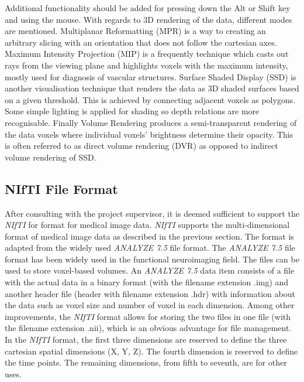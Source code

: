 \documentclass[a4paper,11pt,twoside]{article}
\begin{document}
Additional functionality should be added for pressing down the Alt or Shift key and using the mouse.
With regards to 3D rendering of the data, different modes are mentioned. Multiplanar Reformatting (MPR) is a way to creating an arbitrary slicing with an orientation that does not follow the cartesian axes. Maximum Intensity Projection (MIP) is a frequently technique which casts out rays from the viewing plane and highlights voxels with the maximum intensity, mostly used for diagnosis of vascular structures. Surface Shaded Display (SSD) is another visualisation technique that renders the data as 3D shaded surfaces based on a  given threshold. This is achieved by connecting adjacent voxels as polygons. Some simple lighting is applied for shading so depth relations are more recognisable. Finally Volume Rendering produces a semi-transparent rendering of the data voxels where individual voxels' brightness determine their opacity. This is often referred to as direct volume rendering (DVR) as opposed to indirect volume rendering of SSD.


\subsection{NIfTI File Format}

After consulting with the project supervisor, it is deemed sufficient to support the \textit{NIfTI} for format for medical image data. \textit{NIfTI} supports the multi-dimensional format of medical image data as described in the previous section. The format is adapted from the widely used \textit{ANALYZE 7.5} file format. The \textit{ANALYZE 7.5} file format has been widely used in the functional neuroimaging field. The files can be used to store voxel-based volumes. An \textit{ANALYZE 7.5} data item consists of a file with the actual data in a binary format (with the filename extension .img) and another header file (header with filename extension .hdr) with information about the data such as voxel size and number of voxel in each dimension. Among other improvements, the \textit{NIfTI} format allows for storing the two files in one file (with the filename extension .nii), which is an obvious advantage for file management.
In the \textit{NIfTI} format, the first three dimensions are reserved to define the three cartesian spatial dimensions (X, Y, Z). The fourth dimension is reserved to define the time points. The remaining dimensions, from fifth to seventh, are for other uses. 
\end{document}
